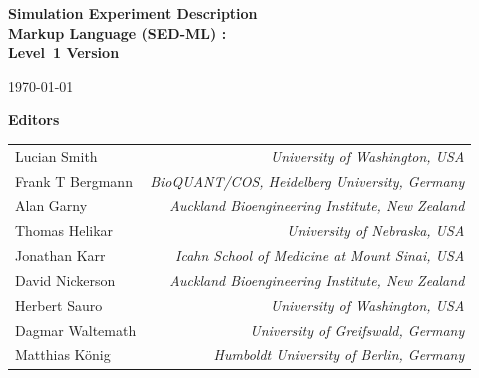 
\begin{titlepage}


\begin{center}

  \textbf{\sffamily\bfseries\huge
    Simulation Experiment Description\\ Markup Language (SED-ML) :\\[0.3em]
    Level~1 Version~}

\vspace*{0.5in}

\large
\today\\[0.25in]


\vspace{0.5in}

\textbf{\sffamily Editors}\\[7pt]
\begin{tabular}{l>{\hspace*{15pt}}r}
Lucian Smith & \emph{University of Washington, USA}\\
Frank T Bergmann & \emph{BioQUANT/COS, Heidelberg University, Germany}\\
Alan Garny & \emph{Auckland Bioengineering Institute, New Zealand}\\
Thomas Helikar & \emph{University of Nebraska, USA}\\
Jonathan Karr & \emph{Icahn School of Medicine at Mount Sinai, USA}\\
David Nickerson & \emph{Auckland Bioengineering Institute, New Zealand}\\
Herbert Sauro & \emph{University of Washington, USA}\\
Dagmar Waltemath & \emph{University of Greifswald, Germany}\\
Matthias K\"{o}nig & \emph{Humboldt University of Berlin, Germany}\\
\end{tabular}
 

\end{center}
\end{titlepage}
